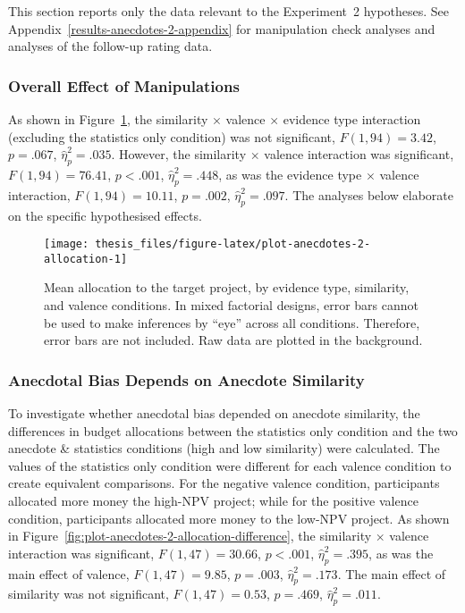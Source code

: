 \documentclass[a4paper, nobind]{templates/ociamthesis}
\theoremstyle{definition}
\theoremstyle{definition}
\theoremstyle{definition}
\theoremstyle{definition}
\theoremstyle{remark}
\begin{document}
This section reports only the data relevant to the Experiment~2 hypotheses. See
Appendix~\ref{results-anecdotes-2-appendix} for manipulation check analyses and
analyses of the follow-up rating data.

\subsubsection{Overall Effect of Manipulations}

As shown in Figure~\ref{fig:plot-anecdotes-2-allocation}, the similarity
\(\times\) valence \(\times\) evidence type interaction (excluding the statistics
only condition) was not significant,
\(F(1, 94) = 3.42\), \(p = .067\), \(\hat{\eta}^2_p = .035\). However,
the similarity \(\times\) valence interaction was significant,
\(F(1, 94) = 76.41\), \(p < .001\), \(\hat{\eta}^2_p = .448\), as was the evidence type
\(\times\) valence interaction,
\(F(1, 94) = 10.11\), \(p = .002\), \(\hat{\eta}^2_p = .097\). The analyses below
elaborate on the specific hypothesised effects.



\begin{figure}
\texttt{[image: thesis\_files/figure-latex/plot-anecdotes-2-allocation-1]} \caption{Mean allocation to the target project, by evidence type, similarity, and valence conditions. In mixed factorial designs, error bars cannot be used to make inferences by ``eye'' across all conditions. Therefore, error bars are not included. Raw data are plotted in the background.}\label{fig:plot-anecdotes-2-allocation}
\end{figure}

\subsubsection{Anecdotal Bias Depends on Anecdote Similarity}

To investigate whether anecdotal bias depended on anecdote similarity, the
differences in budget allocations between the statistics only condition and the
two anecdote \& statistics conditions (high and low similarity) were calculated.
The values of the statistics only condition were different for each valence
condition to create equivalent comparisons. For the negative valence condition,
participants allocated more money the high-NPV project; while for the positive
valence condition, participants allocated more money to the low-NPV project. As
shown in Figure~\ref{fig:plot-anecdotes-2-allocation-difference}, the
similarity \(\times\) valence interaction was significant,
\(F(1, 47) = 30.66\), \(p < .001\), \(\hat{\eta}^2_p = .395\), as was the
main effect of valence, \(F(1, 47) = 9.85\), \(p = .003\), \(\hat{\eta}^2_p = .173\).
The main effect of similarity was not significant,
\(F(1, 47) = 0.53\), \(p = .469\), \(\hat{\eta}^2_p = .011\).
\end{document}
